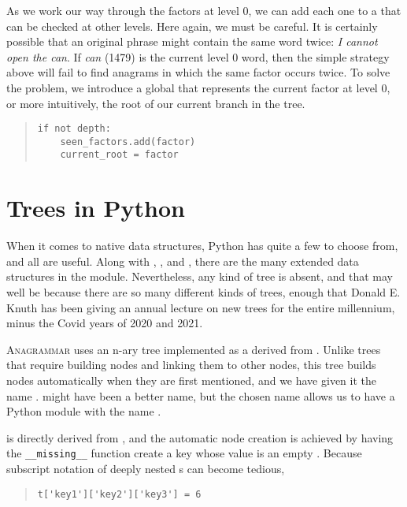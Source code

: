 \documentclass[letterpaper, 11pt]{article}
\providecommand{\anagrammar}{A\textsc{nagrammar}\xspace}
\begin{document}
As we work our way through the factors at level $0$, we can add
each one to a  that can be checked at other levels.  Here
again, we must be careful. It is certainly possible that an original
phrase might contain the same word twice: \emph{I cannot open the
can}. If \emph{can} (1479) is the current level $0$ word, then the
simple strategy above will fail to find anagrams in which the same
factor occurs twice. To solve the problem, we introduce a global
that represents the current factor at level $0$, or more intuitively,
the root of our current branch in the tree.

\begin{quote}
\begin{verbatim}
if not depth:
    seen_factors.add(factor)
    current_root = factor
\end{verbatim}
\end{quote}
 


\section{Trees in Python}
\label{sec:trees}

When it comes to native data structures, Python has quite a few to
choose from, and all are useful. Along with , ,
and , there are the many extended data structures in the
 module.  Nevertheless, any kind of tree is absent,
and that may well be because there are so many different kinds of
trees, enough that Donald E. Knuth has been giving an annual lecture
on new trees for the entire millennium, minus the Covid years of
2020 and 2021.

\anagrammar uses an n-ary tree implemented as a  derived
from .  Unlike trees that require building nodes and
linking them to other nodes, this tree builds nodes automatically
when they are first mentioned, and we have given it the name
\texttrademark.  might have been
a better name, but the chosen name allows us to have a Python module
with the name .

 is directly derived from , and the
automatic node creation is achieved by having the \verb|__missing__|
function create a key whose value is an empty .
Because subscript notation of deeply nested s can become
tedious,

\begin{quote}
\begin{verbatim}
t['key1']['key2']['key3'] = 6
\end{verbatim}
\end{quote}
\end{document}
